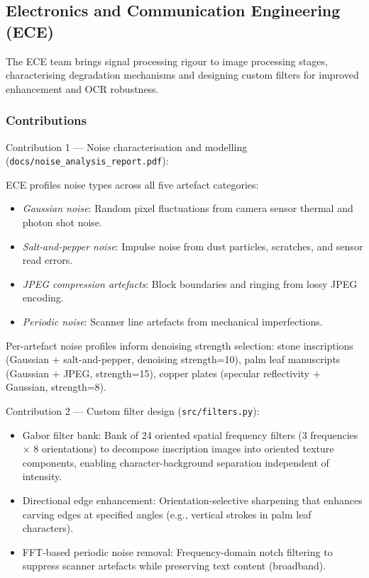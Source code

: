 \subsection{Electronics and Communication Engineering (ECE)}

The ECE team brings signal processing rigour to image processing stages, characterising degradation mechanisms and designing custom filters for improved enhancement and OCR robustness.

\subsubsection{Contributions}

Contribution 1 — Noise characterisation and modelling (\texttt{docs/noise\_analysis\_report.pdf}):

ECE profiles noise types across all five artefact categories:
\begin{itemize}
	\item \textit{Gaussian noise}: Random pixel fluctuations from camera sensor thermal and photon shot noise.
	\item \textit{Salt-and-pepper noise}: Impulse noise from dust particles, scratches, and sensor read errors.
	\item \textit{JPEG compression artefacts}: Block boundaries and ringing from lossy JPEG encoding.
	\item \textit{Periodic noise}: Scanner line artefacts from mechanical imperfections.
\end{itemize}

Per-artefact noise profiles inform denoising strength selection: stone inscriptions (Gaussian + salt-and-pepper, denoising strength=10), palm leaf manuscripts (Gaussian + JPEG, strength=15), copper plates (specular reflectivity + Gaussian, strength=8).

Contribution 2 — Custom filter design (\texttt{src/filters.py}):

\begin{itemize}
	\item Gabor filter bank: Bank of 24 oriented spatial frequency filters (3 frequencies × 8 orientations) to decompose inscription images into oriented texture components, enabling character-background separation independent of intensity.
	
	\item Directional edge enhancement: Orientation-selective sharpening that enhances carving edges at specified angles (e.g., vertical strokes in palm leaf characters).
	
	\item FFT-based periodic noise removal: Frequency-domain notch filtering to suppress scanner artefacts while preserving text content (broadband).
\end{itemize}

